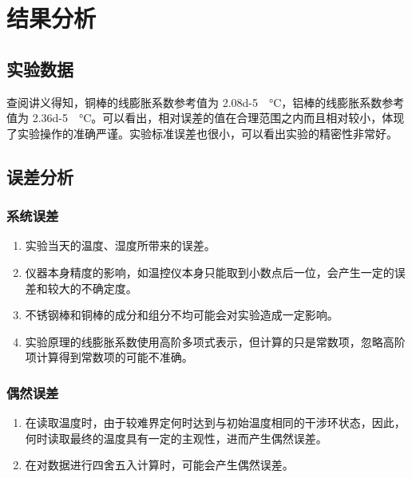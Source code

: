 \section{结果分析}
\subsection{实验数据}
查阅讲义得知，铜棒的线膨胀系数参考值为 \SI{2.08d-5}{\per\degreeCelsius}，铝棒的线膨胀系数参考值为 \SI{2.36d-5}{\per\degreeCelsius}。可以看出，相对误差的值在合理范围之内而且相对较小，体现了实验操作的准确严谨。实验标准误差也很小，可以看出实验的精密性非常好。
\subsection{误差分析}
\subsubsection{系统误差}
\begin{enumerate}
    \item 实验当天的温度、湿度所带来的误差。
    \item 仪器本身精度的影响，如温控仪本身只能取到小数点后一位，会产生一定的误差和较大的不确定度。
    \item 不锈钢棒和铜棒的成分和组分不均可能会对实验造成一定影响。
    \item 实验原理的线膨胀系数使用高阶多项式表示，但计算的只是常数项，忽略高阶项计算得到常数项的可能不准确。
\end{enumerate}
\subsubsection{偶然误差}
\begin{enumerate}
    \item 在读取温度时，由于较难界定何时达到与初始温度相同的干涉环状态，因此，何时读取最终的温度具有一定的主观性，进而产生偶然误差。
    \item 在对数据进行四舍五入计算时，可能会产生偶然误差。
\end{enumerate}

